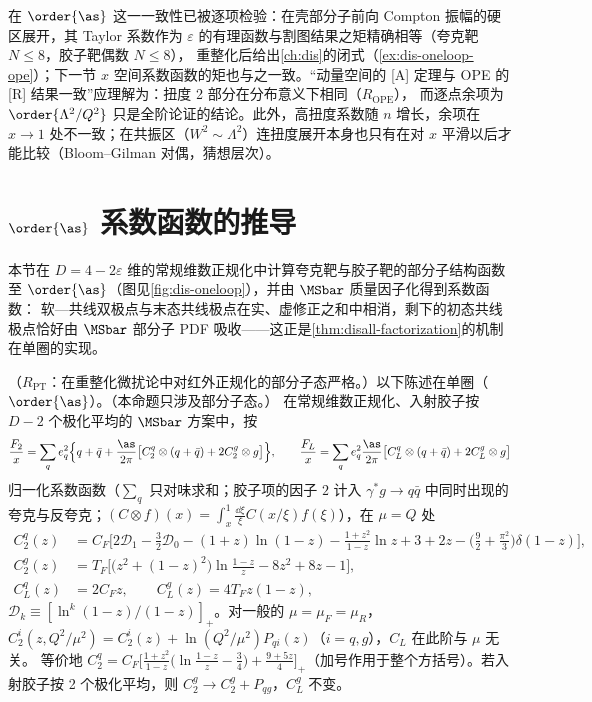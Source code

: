 \noindent
在 $\order{\as}$ 这一一致性已被逐项检验：在壳部分子前向 Compton 振幅的硬区展开，其 Taylor 系数作为 $\varepsilon$ 的有理函数与割图结果之矩精确相等（夸克靶 $N\le8$，胶子靶偶数 $N\le8$），
重整化后给出\cref{ch:dis}的闭式（\cref{ex:dis-oneloop-ope}）；下一节 $x$ 空间系数函数的矩也与之一致。“动量空间的 [A] 定理与 OPE 的 [R] 结果一致”应理解为：扭度 2 部分在分布意义下相同（$R_{\mathrm{OPE}}$），   %
而逐点余项为 $\order{\Lambda^2/Q^2}$ 只是全阶论证的结论。此外，高扭度系数随 $n$ 增长，余项在 $x\to1$ 处不一致；在共振区（$W^2\sim\Lambda^2$）连扭度展开本身也只有在对 $x$ 平滑以后才能比较（Bloom--Gilman 对偶，猜想层次）。
\section{$\order{\as}$ 系数函数的推导}\label{sec:disall-nlo}

本节在 $D=4-2\varepsilon$ 维的常规维数正规化中计算夸克靶与胶子靶的部分子结构函数至 $\order{\as}$（图见\cref{fig:dis-oneloop}），并由 $\MSbar$ 质量因子化得到系数函数：
软—共线双极点与末态共线极点在实、虚修正之和中相消，剩下的初态共线极点恰好由 $\MSbar$ 部分子 PDF 吸收——这正是\cref{thm:disall-factorization}的机制在单圈的实现。

\begin{proposition}\label{prop:disall-nlo}
（$R_{\mathrm{PT}}$：在重整化微扰论中对红外正规化的部分子态严格。）以下陈述在单圈（$\order{\as}$）。（本命题只涉及部分子态。）
在常规维数正规化、入射胶子按 $D-2$ 个极化平均的 $\MSbar$ 方案中，按
\begin{equation}\label{eq:disall-norm}
\frac{F_2}{x}=\sum_qe_q^2\Big\{q+\bar q+\frac{\as}{2\pi}\big[C_2^q\otimes(q+\bar q)+2C_2^g\otimes g\big]\Big\},\qquad
\frac{F_L}{x}=\sum_qe_q^2\frac{\as}{2\pi}\big[C_L^q\otimes(q+\bar q)+2C_L^g\otimes g\big]
\end{equation}
归一化系数函数（$\sum_q$ 只对味求和；胶子项的因子 $2$ 计入 $\gamma^*g\to q\bar q$ 中同时出现的夸克与反夸克；$(C\otimes f)(x)=\int_x^1\frac{\dd\xi}\xi C(x/\xi)f(\xi)$），在 $\mu=Q$ 处
\begin{equation}\label{eq:disall-C}
\begin{aligned}
C_2^q(z)&=C_F\Big[2\mathcal D_1-\frac32\mathcal D_0-(1+z)\ln(1-z)-\frac{1+z^2}{1-z}\ln z+3+2z-\Big(\frac92+\frac{\pi^2}3\Big)\delta(1-z)\Big],\\
C_2^g(z)&=T_F\Big[\big(z^2+(1-z)^2\big)\ln\frac{1-z}{z}-8z^2+8z-1\Big],\\
C_L^q(z)&=2C_Fz,\qquad C_L^g(z)=4T_Fz(1-z),
\end{aligned}   %
\end{equation}
$\mathcal D_k\equiv[\ln^k(1-z)/(1-z)]_+$。对一般的 $\mu=\mu_F=\mu_R$，$C_2^i(z,Q^2/\mu^2)=C_2^i(z)+\ln(Q^2/\mu^2)P_{qi}(z)$（$i=q,g$），$C_L$ 在此阶与 $\mu$ 无关。
等价地 $C_2^q=C_F\big[\frac{1+z^2}{1-z}\big(\ln\frac{1-z}z-\frac34\big)+\frac{9+5z}4\big]_+$（加号作用于整个方括号）。若入射胶子按 2 个极化平均，则 $C_2^g\to C_2^g+P_{qg}$，$C_L^g$ 不变。
\end{proposition}

